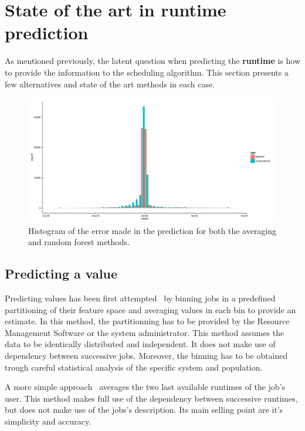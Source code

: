 \documentclass{article}
\begin{document}
\section{State of the art in \textbf{runtime} prediction}

As mentioned previously, the latent question when predicting the \textbf{runtime} is how to provide the information to the scheduling algorithm. This section presents a few alternatives and state of the art methods in each case.

\begin{figure}[b]
  \centering
  \includegraphics[width=\textwidth]{../../truc.png}
  \caption{Histogram of the error made in the prediction for both the averaging and random forest methods.}
  \label{fig:ratio}
\end{figure}


\subsection{Predicting a value}
\label{sub:predicting_a_value}

Predicting values has been first attempted~\cite{gibbons} by binning jobs in a predefined partitioning of their feature space and averaging values in each bin to provide an estimate. In this method, the partitionning has to be provided by the Resource Management Software or the system administrator. This method assumes the data to be identically distributed and independent. It does not make use of dependency between successive jobs. Moreover, the binning has to be obtained trough careful statistical analysis of the specific system and population.

A more simple approach~\cite{tsafir} averages the two last available runtimes of the job's user.
This method makes full use of the dependency between successive runtimes, but does not make use of the jobs's description. Its main selling point are it's simplicity and accuracy.
\end{document}
